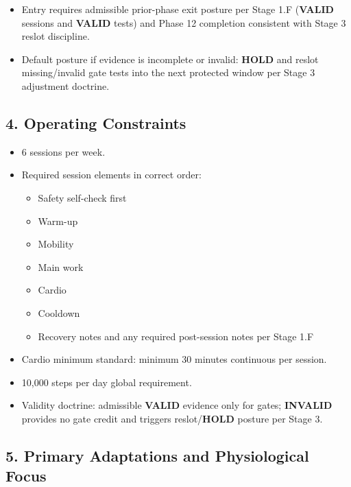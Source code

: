 \documentclass[10pt]{article}
\begin{document}
\begin{itemize}
\item Entry requires admissible prior-phase exit posture per Stage 1.F (\textbf{VALID} sessions and \textbf{VALID} tests) and Phase 12 completion consistent with Stage 3 reslot discipline.
\item Default posture if evidence is incomplete or invalid: \textbf{HOLD} and reslot missing/invalid gate tests into the next protected window per Stage 3 adjustment doctrine.
\end{itemize}

\subsection*{4. Operating Constraints}

\begin{itemize}
\item 6 sessions per week.
\item Required session elements in correct order:
  \begin{itemize}
  \item Safety self-check first
  \item Warm-up
  \item Mobility
  \item Main work
  \item Cardio
  \item Cooldown
  \item Recovery notes and any required post-session notes per Stage 1.F
  \end{itemize}
\item Cardio minimum standard: minimum 30 minutes continuous per session.
\item 10,000 steps per day global requirement.
\item Validity doctrine: admissible \textbf{VALID} evidence only for gates; \textbf{INVALID} provides no gate credit and triggers reslot/\textbf{HOLD} posture per Stage 3.
\end{itemize}

\newpage
\subsection*{5. Primary Adaptations and Physiological Focus}
\end{document}
